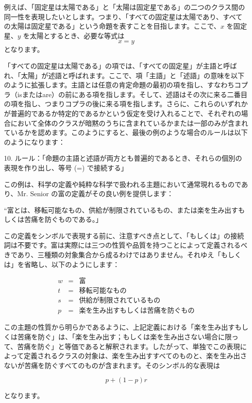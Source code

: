 \documentclass[a4paper,11pt,openany]{ltjsbook}
\begin{document}
例えば、「固定星は太陽である」と「太陽は固定星である」の二つのクラス間の同一性を表現したいとします。つまり、「すべての固定星は太陽であり、すべての太陽は固定星である」という命題を表すことを目指します。ここで、$x$ を固定星、$y$ を太陽とするとき、必要な等式は
\[
x = y
\]
となります。

「すべての固定星は太陽である」の項では、「すべての固定星」が主語と呼ばれ、「太陽」が述語と呼ばれます。ここで、項「主語」と「述語」の意味を以下のように拡張します。主語とは任意の肯定命題の最初の項を指し、すなわちコプラ（isまたはare）の前にある項を指します。そして、述語はその次に来る二番目の項を指し、つまりコプラの後に来る項を指します。さらに、これらのいずれかが普遍的であるか特定的であるかという仮定を受け入れることで、それぞれの場合において全体のクラスが暗黙のうちに含まれているかまたは一部のみが含まれているかを認めます。このようにすると、最後の例のような場合のルールは以下のようになります：

10. ルール：「命題の主語と述語が両方とも普遍的であるとき、それらの個別の表現を作り出し、等号 (=) で接続する」

この例は、科学の定義や純粋な科学で扱われる主題において通常現れるものであり、Mr. Senior の富の定義がその良い例を提供します：

``富とは、移転可能なもの、供給が制限されているもの、または楽を生み出すもしくは苦痛を防ぐものである。」

この定義をシンボルで表現する前に、注意すべき点として、「もしくは」の接続詞は不要です。富は実際には三つの性質や品質を持つことによって定義されるべきであり、三種類の対象集合から成るわけではありません。それゆえ「もしくは」を省略し、以下のようにします：

\begin{eqnarray*}
w &=& \text{富} \\
t &=& \text{移転可能なもの} \\
s &=& \text{供給が制限されているもの} \\
p &=& \text{楽を生み出すもしくは苦痛を防ぐもの}
\end{eqnarray*}

この主題の性質から明らかであるように、上記定義における「楽を生み出すもしくは苦痛を防ぐ」は、「楽を生み出す；もしくは楽を生み出さない場合に限って、苦痛を防ぐ」と等価であると解釈されます。したがって、単独でこの表現によって定義されるクラスの対象は、楽を生み出すすべてのものと、楽を生み出さないが苦痛を防ぐすべてのものが含まれます。そのシンボル的な表現は

$$p + (1 - p)r$$

となります。
\end{document}
